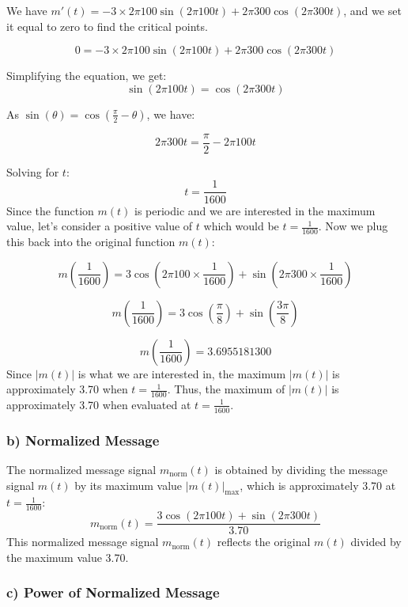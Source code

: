 \documentclass{article}
\begin{document}
We have \( m'(t) = -3 \times 2\pi 100 \sin(2\pi 100t) + 2\pi 300 \cos(2\pi 300t) \), and we set it equal to zero to find the critical points.

\[
0 = -3 \times 2\pi 100 \sin(2\pi 100t) + 2\pi 300 \cos(2\pi 300t)
\]

Simplifying the equation, we get:
\[
\sin(2\pi 100t) = \cos(2\pi 300t)
\]

As \( \sin(\theta) = \cos(\frac{\pi}{2} - \theta) \), we have:

\[
2\pi 300t = \frac{\pi}{2} - 2\pi 100t
\]

Solving for \( t \):
\[
t = \frac{1}{1600}
\]
Since the function \( m(t) \) is periodic and we are interested in the maximum value, let's consider a positive value of \( t \) which would be \( t = \frac{1}{1600} \).
\newline \newline
Now we plug this back into the original function \( m(t) \):

\[
m\left(\frac{1}{1600}\right) = 3\cos\left(2\pi 100 \times \frac{1}{1600}\right) + \sin\left(2\pi 300 \times \frac{1}{1600}\right)
\]

\[
m\left(\frac{1}{1600}\right) = 3\cos\left(\frac{\pi}{8}\right) + \sin\left(\frac{3\pi}{8}\right)
\]

\[
m\left(\frac{1}{1600}\right) = 3.6955181300
\]
Since \( |m(t)| \) is what we are interested in, the maximum \( |m(t)| \) is approximately 3.70 when \( t = \frac{1}{1600} \).
\newline \newline
Thus, the maximum of \( |m(t)| \) is approximately 3.70 when evaluated at \( t = \frac{1}{1600} \).


\subsubsection*{b) Normalized Message}

The normalized message signal \( m_{\text{norm}}(t) \) is obtained by dividing the message signal \( m(t) \) by its maximum value \( |m(t)|_{\text{max}} \), which is approximately 3.70 at \( t = \frac{1}{1600} \):
\[
m_{\text{norm}}(t) = \frac{3\cos(2\pi 100t) + \sin(2\pi 300t)}{3.70}
\]
This normalized message signal \( m_{\text{norm}}(t) \) reflects the original \( m(t) \) divided by the maximum value 3.70.
\subsubsection*{c) Power of Normalized Message}
\end{document}
